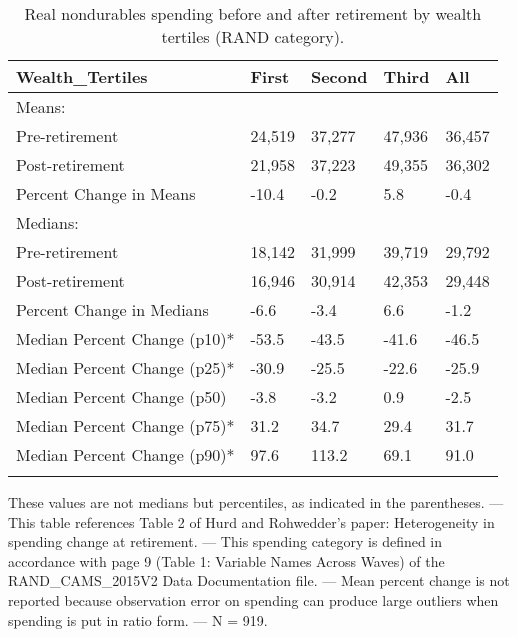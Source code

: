 \begin{table}[tbp] \centering
{}

\caption{Real nondurables spending before and after retirement by wealth tertiles (RAND category).}
\begin{tabularx}{\textwidth}{lCCCC}

\toprule
{Wealth\_Tertiles}&{First}&{Second}&{Third}&{All} \tabularnewline
\midrule\addlinespace[1.5ex]
Means:&&&& \tabularnewline
\midrule Pre-retirement&24,519&37,277&47,936&36,457 \tabularnewline
Post-retirement&21,958&37,223&49,355&36,302 \tabularnewline
Percent Change in Means&-10.4&-0.2&5.8&-0.4 \tabularnewline
\midrule Medians:&&&& \tabularnewline
\midrule Pre-retirement&18,142&31,999&39,719&29,792 \tabularnewline
Post-retirement&16,946&30,914&42,353&29,448 \tabularnewline
Percent Change in Medians&-6.6&-3.4&6.6&-1.2 \tabularnewline
Median Percent Change (p10)*&-53.5&-43.5&-41.6&-46.5 \tabularnewline
Median Percent Change (p25)*&-30.9&-25.5&-22.6&-25.9 \tabularnewline
Median Percent Change (p50)&-3.8&-3.2&0.9&-2.5 \tabularnewline
Median Percent Change (p75)*&31.2&34.7&29.4&31.7 \tabularnewline
Median Percent Change (p90)*&97.6&113.2&69.1&91.0 \tabularnewline
\bottomrule \addlinespace[1.5ex]

\end{tabularx}
\begin{flushleft}
\footnotesize *These values are not medians but percentiles, as indicated in the parentheses. \linebreak --- \linebreak This table references Table 2 of Hurd and Rohwedder's paper: Heterogeneity in spending change at retirement. \linebreak --- \linebreak This spending category is defined in accordance with page 9 (Table 1: Variable Names Across Waves) of the RAND\_CAMS\_2015V2 Data Documentation file. \linebreak --- \linebreak Mean percent change is not reported because observation error on spending can produce large outliers when spending is put in ratio form. \linebreak --- \linebreak N = 919.
\end{flushleft}
\end{table}
